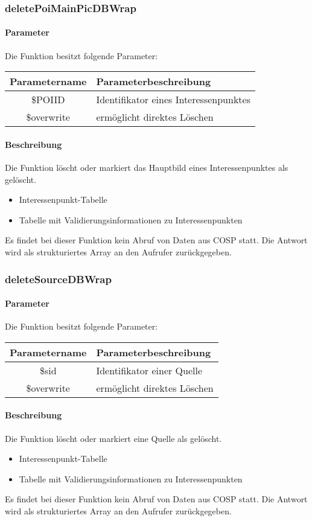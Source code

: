 \subsubsection{deletePoiMainPicDBWrap}
\paragraph{Parameter} Die Funktion besitzt folgende Parameter:
\begin{table}[H]
	\begin{tabular}{|c|p{11cm}|}
		\hline
		\textbf{Parametername} & \textbf{Parameterbeschreibung} \\ \hline
		\$POIID     & Identifikator eines Interessenpunktes \\ \hline
		\$overwrite & ermöglicht direktes Löschen \\ \hline
	\end{tabular}
\end{table}
\paragraph{Beschreibung} Die Funktion löscht oder markiert das Hauptbild eines Interessenpunktes als gelöscht.
\begin{itemize}
	\item Interessenpunkt-Tabelle
	\item Tabelle mit Validierungsinformationen zu Interessenpunkten
\end{itemize}
Es findet bei dieser Funktion kein Abruf von Daten aus {\glqq COSP\grqq} statt. Die Antwort wird als strukturiertes Array an den Aufrufer zurückgegeben.
\subsubsection{deleteSourceDBWrap}
\paragraph{Parameter} Die Funktion besitzt folgende Parameter:
\begin{table}[H]
	\begin{tabular}{|c|p{11cm}|}
		\hline
		\textbf{Parametername} & \textbf{Parameterbeschreibung} \\ \hline
		\$sid       & Identifikator einer Quelle \\ \hline
		\$overwrite & ermöglicht direktes Löschen \\ \hline
	\end{tabular}
\end{table}
\paragraph{Beschreibung} Die Funktion löscht oder markiert eine Quelle als gelöscht.
\begin{itemize}
	\item Interessenpunkt-Tabelle
	\item Tabelle mit Validierungsinformationen zu Interessenpunkten
\end{itemize}
Es findet bei dieser Funktion kein Abruf von Daten aus {\glqq COSP\grqq} statt. Die Antwort wird als strukturiertes Array an den Aufrufer zurückgegeben.